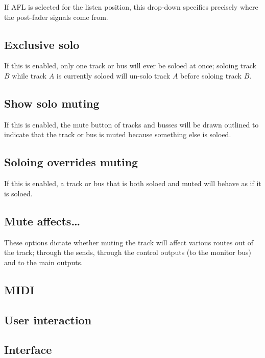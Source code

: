 \documentclass[10pt,a4paper]{book}
\begin{document}
If AFL is selected for the listen position, this drop-down specifies
precisely where the post-fader signals come from.

\subsection{Exclusive solo}

If this is enabled, only one track or bus will ever be soloed at once;
soloing track $B$ while track $A$ is currently soloed will un-solo
track $A$ before soloing track $B$.

\subsection{Show solo muting}

If this is enabled, the mute button of tracks and busses will be drawn
outlined to indicate that the track or bus is muted because something
else is soloed.

\subsection{Soloing overrides muting}

If this is enabled, a track or bus that is both soloed and muted will
behave as if it is soloed.

\subsection{Mute affects\ldots}

These options dictate whether muting the track will affect various
routes out of the track; through the sends, through the control
outputs (to the monitor bus) and to the main outputs.


\subsection{MIDI}
\subsection{User interaction}
\subsection{Interface}




\end{document}
